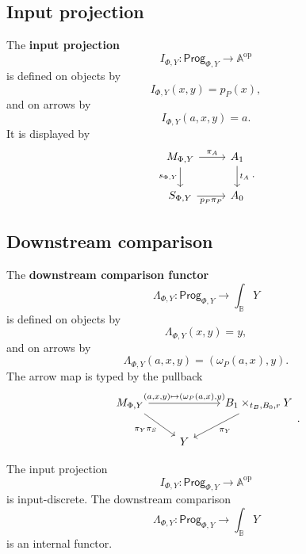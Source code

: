 \subsection{Input projection}
\label{subsec:relative-input-projection}

\begin{definition}
\label{def:relative-input-projection}
The \textbf{input projection}
\[
I_{\Phi,Y}:\mathsf{Prog}_{\Phi,Y}\to\mathbb A^{\mathrm{op}}
\]
is defined on objects by
\[
I_{\Phi,Y}(x,y)=p_P(x),
\]
and on arrows by
\[
I_{\Phi,Y}(a,x,y)=a.
\]
It is displayed by
\[
\begin{tikzcd}
M_{\Phi,Y}
\arrow[r,"\pi_A"]
\arrow[d,"s_{\Phi,Y}"']
&
A_1
\arrow[d,"t_A"]
\\
S_{\Phi,Y}
\arrow[r,"p_P\pi_P"']
&
A_0
\end{tikzcd}
.
\]
\end{definition}

\subsection{Downstream comparison}
\label{subsec:relative-downstream-comparison}

\begin{definition}
\label{def:relative-downstream-comparison}
The \textbf{downstream comparison functor}
\[
\Lambda_{\Phi,Y}:\mathsf{Prog}_{\Phi,Y}\to\int_{\mathbb B}Y
\]
is defined on objects by
\[
\Lambda_{\Phi,Y}(x,y)=y,
\]
and on arrows by
\[
\Lambda_{\Phi,Y}(a,x,y)
=
(\omega_P(a,x),y).
\]
The arrow map is typed by the pullback
\[
\begin{tikzcd}
M_{\Phi,Y}
\arrow[rr,"{(a,x,y)\mapsto(\omega_P(a,x),y)}"]
\arrow[dr,"\pi_Y\pi_S"']
&&
B_1\times_{t_B,B_0,r}Y
\arrow[dl,"\pi_Y"]
\\
& Y &
\end{tikzcd}
.
\]
\end{definition}

\begin{theorem}
\label{thm:relative-input-downstream-functors}
The input projection
\[
I_{\Phi,Y}:\mathsf{Prog}_{\Phi,Y}\to\mathbb A^{\mathrm{op}}
\]
is input-discrete. The downstream comparison
\[
\Lambda_{\Phi,Y}:\mathsf{Prog}_{\Phi,Y}\to\int_{\mathbb B}Y
\]
is an internal functor.
\end{theorem}

